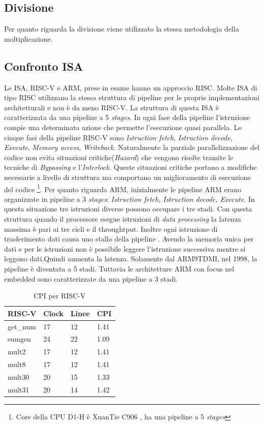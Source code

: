\documentclass[12pt, a4paper]{report}
\begin{document}
\vspace{2cm}

\subsection{Divisione}
Per quanto riguarda la divisione viene utilizzato la stessa metodologia della moltiplicazione.

\subsection{Confronto ISA}
Le ISA, RISC-V e ARM, prese in esame hanno un approccio RISC. 
Molte ISA di tipo RISC utilizzano la stessa struttura di pipeline per le proprie implementazioni architetturali e non è da meno RISC-V. La struttura di questa ISA è caratterizzata da una pipeline a 5 \textit{stages}. In ogni fase della pipeline l'istruzione compie una determinata azione che permette l'esecuzione quasi parallela. 
Le cinque fasi della pipeline RISC-V sono \textit{Istruction fetch}, \textit{Istruction decode}, \textit{Execute}, \textit{Memory access}, \textit{Writeback}. %
Naturalmente la parziale parallelizzazione del codice non evita situazioni critiche(\textit{Hazard}) che vengono risolte tramite le tecniche di \textit{Bypassing} e l'\textit{Interlock}. Queste situazioni critiche portano a modifiche necessarie a livello di struttura ma comportano un miglioramento di esecuzione del codice \footnote{Core della CPU D1-H è XuanTie C906 \cite{DocH1}, ha una pipeline a 5 \textit{stages}}. 
Per quanto riguarda ARM, inizialmente le pipeline ARM erano organizzate in pipeline a 3 \textit{stages}: \textit{Istruction fetch}, \textit{Istruction decode, Execute}. In questa situazione tre istruzioni diverse possono occupare i tre stadi. Con questa struttura quando il processore esegue istruzioni di \textit{data processing} la latenza massima è pari ai tre cicli e il throughtput. Inoltre ogni istruzione di trasferimento dati causa uno stallo della pipeline \cite{3stagesPipeline}. Avendo la memoria unica per dati e per le istruzioni non è possibile leggere l'istruzione successiva mentre si leggono dati.Quindi aumenta la latenza. Solamente dal ARM9TDMI, nel 1998, la pipeline è diventata a 5 stadi. Tuttavia le architetture ARM con focus nel embedded sono caratterizzate da una pipeline a 3 stadi. 


\begin{table}[ht]
\centering
\begin{tabular}{|l|l|l|l|}
\hline
RISC-V   & Clock & Linee & CPI  \\ \hline
get\_num & 17    & 12    & 1.41 \\ \hline
sumgen   & 24    & 22    & 1.09 \\ \hline
mult2    & 17    & 12    & 1.41 \\ \hline
mult8    & 17    & 12    & 1.41 \\ \hline
mult30   & 20    & 15    & 1.33 \\ \hline
mult31   & 20    & 14    & 1.42 \\ \hline
\end{tabular}
\caption{CPI per RISC-V}
\label{tab:CPI_RISCV}
\end{table}
\end{document}

